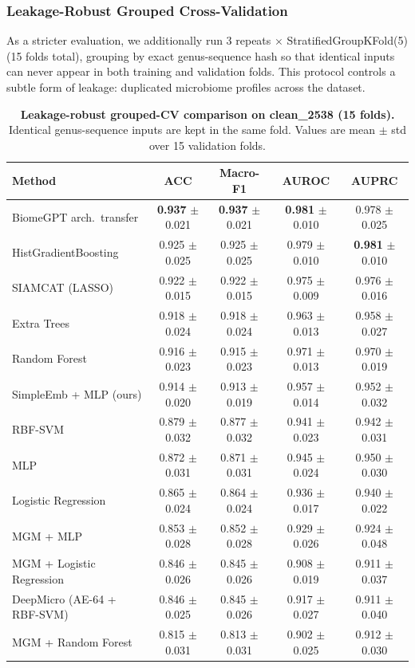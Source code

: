 \documentclass[11pt,a4paper]{article}
\begin{document}
\subsubsection{Leakage-Robust Grouped Cross-Validation}

As a stricter evaluation, we additionally run 3 repeats $\times$ StratifiedGroupKFold(5) (15 folds total), grouping by exact genus-sequence hash so that identical inputs can never appear in both training and validation folds. This protocol controls a subtle form of leakage: duplicated microbiome profiles across the dataset.

\begin{table}[ht]
\centering
\caption{\textbf{Leakage-robust grouped-CV comparison on clean\_2538 (15 folds).}
Identical genus-sequence inputs are kept in the same fold.
Values are mean $\pm$ std over 15 validation folds.}
\label{tab:groupcv}
\begin{tabular}{lcccc}
\toprule
\textbf{Method} & \textbf{ACC} & \textbf{Macro-F1} & \textbf{AUROC} & \textbf{AUPRC} \\
\midrule
BiomeGPT arch.\ transfer & \textbf{0.937} $\pm$ 0.021 & \textbf{0.937} $\pm$ 0.021 & \textbf{0.981} $\pm$ 0.010 & 0.978 $\pm$ 0.025 \\
HistGradientBoosting & 0.925 $\pm$ 0.025 & 0.925 $\pm$ 0.025 & 0.979 $\pm$ 0.010 & \textbf{0.981} $\pm$ 0.010 \\
SIAMCAT (LASSO) & 0.922 $\pm$ 0.015 & 0.922 $\pm$ 0.015 & 0.975 $\pm$ 0.009 & 0.976 $\pm$ 0.016 \\
Extra Trees & 0.918 $\pm$ 0.024 & 0.918 $\pm$ 0.024 & 0.963 $\pm$ 0.013 & 0.958 $\pm$ 0.027 \\
Random Forest & 0.916 $\pm$ 0.023 & 0.915 $\pm$ 0.023 & 0.971 $\pm$ 0.013 & 0.970 $\pm$ 0.019 \\
SimpleEmb + MLP (ours) & 0.914 $\pm$ 0.020 & 0.913 $\pm$ 0.019 & 0.957 $\pm$ 0.014 & 0.952 $\pm$ 0.032 \\
RBF-SVM & 0.879 $\pm$ 0.032 & 0.877 $\pm$ 0.032 & 0.941 $\pm$ 0.023 & 0.942 $\pm$ 0.031 \\
MLP & 0.872 $\pm$ 0.031 & 0.871 $\pm$ 0.031 & 0.945 $\pm$ 0.024 & 0.950 $\pm$ 0.030 \\
Logistic Regression & 0.865 $\pm$ 0.024 & 0.864 $\pm$ 0.024 & 0.936 $\pm$ 0.017 & 0.940 $\pm$ 0.022 \\
MGM + MLP & 0.853 $\pm$ 0.028 & 0.852 $\pm$ 0.028 & 0.929 $\pm$ 0.026 & 0.924 $\pm$ 0.048 \\
MGM + Logistic Regression & 0.846 $\pm$ 0.026 & 0.845 $\pm$ 0.026 & 0.908 $\pm$ 0.019 & 0.911 $\pm$ 0.037 \\
DeepMicro (AE-64 + RBF-SVM) & 0.846 $\pm$ 0.025 & 0.845 $\pm$ 0.026 & 0.917 $\pm$ 0.027 & 0.911 $\pm$ 0.040 \\
MGM + Random Forest & 0.815 $\pm$ 0.031 & 0.813 $\pm$ 0.031 & 0.902 $\pm$ 0.025 & 0.912 $\pm$ 0.030 \\
\bottomrule
\end{tabular}
\end{table}
\end{document}
